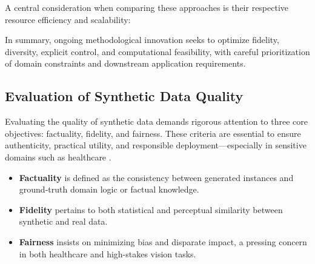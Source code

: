 \documentclass[sigconf]{acmart}
\begin{document}
A central consideration when comparing these approaches is their respective resource efficiency and scalability:


In summary, ongoing methodological innovation seeks to optimize fidelity, diversity, explicit control, and computational feasibility, with careful prioritization of domain constraints and downstream application requirements.

\subsection{Evaluation of Synthetic Data Quality}

Evaluating the quality of synthetic data demands rigorous attention to three core objectives: factuality, fidelity, and fairness. These criteria are essential to ensure authenticity, practical utility, and responsible deployment—especially in sensitive domains such as healthcare \cite{ref87}\cite{ref88}\cite{ref89}. 

\begin{itemize}
    \item \textbf{Factuality} is defined as the consistency between generated instances and ground-truth domain logic or factual knowledge.
    \item \textbf{Fidelity} pertains to both statistical and perceptual similarity between synthetic and real data.
    \item \textbf{Fairness} insists on minimizing bias and disparate impact, a pressing concern in both healthcare and high-stakes vision tasks.
\end{itemize}
\end{document}

